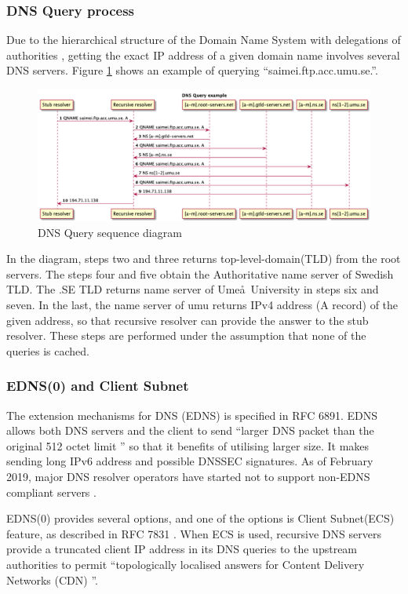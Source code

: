 \subsubsection{DNS Query process}
Due to the hierarchical structure of the Domain Name System with delegations of authorities \cite{rfc1591}, getting the exact IP address of a given domain name involves several DNS servers. Figure \ref{queryprocess} shows an example of querying ``saimei.ftp.acc.umu.se.''. 
\begin{figure}[ht!]
    \begin{center}
        \includegraphics*[width=\columnwidth]{img/dnsquery}
    \end{center}
    \caption{DNS Query sequence diagram}
    \label{queryprocess}
\end{figure}
In the diagram, steps two and three returns top-level-domain(TLD) from the root servers. The steps four and five obtain the Authoritative name server of Swedish TLD. The .SE TLD returns name server of Ume\aa\ University in steps six and seven. In the last, the name server of umu returns IPv4 address (A record) of the given address, so that recursive resolver can provide the answer to the stub resolver. These steps are performed under the assumption that none of the queries is cached.

\subsubsection{EDNS(0) and Client Subnet}
The extension mechanisms for DNS (EDNS) is specified in RFC 6891.
EDNS allows both DNS servers and the client to send ``larger DNS packet than the original 512 octet limit \cite{rfc6891}'' so that it benefits of utilising larger size.
It makes sending long IPv6 address and possible DNSSEC signatures.
As of February 2019, major DNS resolver operators have started not to support non-EDNS compliant servers \cite{dns-flag-day, spacek-edns-camel-diet}. 

EDNS(0) provides several options, and one of the options is Client Subnet(ECS) feature, as described in RFC 7831 \cite{rfc7871}. When ECS is used, recursive DNS servers provide a truncated client IP address in its DNS queries to the upstream authorities to permit ``topologically localised answers for Content Delivery Networks (CDN) \cite{kintis2016understanding}''.

